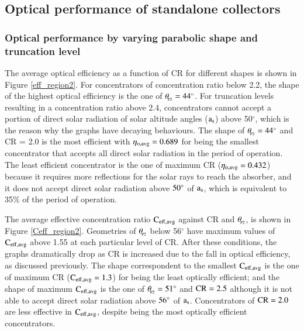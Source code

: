 

\subsection{Optical performance of standalone collectors}

\subsubsection{Optical performance by varying parabolic shape and truncation level}

The average optical efficiency as a function of CR for different shapes is shown in Figure \ref{eff_region2}. For concentrators of concentration ratio below 2.2, the shape of the highest optical efficiency is the one of $\theta_{\!_{\rm{P2}}} = 44^{\circ}$. For truncation levels resulting in a concentration ratio above 2.4, concentrators cannot accept a portion of direct solar radiation of solar altitude angles ($\rm{a_s}$) above 50$^{\circ}$, which is the reason why the graphs have decaying behaviours. The shape of $\theta_{\!_{\rm{P2}}} = 44^{\circ}$ and CR = 2.0 is the most efficient with $\rm{\eta_{o,avg} = 0.689}$ for being the smallest concentrator that accepts all direct solar radiation in the period of operation. The least efficient concentrator is the one of maximum CR ($\rm{\eta_{o,avg} = 0.432}$) because it requires more reflections for the solar rays to reach the absorber, and it does not accept direct solar radiation above $\rm{50^{\circ}}$ of $\rm{a_s}$, which is equivalent to 35\% of the period of operation.


The average effective concentration ratio $\rm{C_{eff,avg}}$ against CR and $\theta_{\!_{\rm{P2}}}$, is shown in Figure \ref{Ceff_region2}. Geometries of $\theta_{\!_{\rm{P2}}}$ below 56$^{\circ}$ have maximum values of $\rm{C_{eff,avg}}$ above 1.55 at each particular level of CR. After these conditions, the graphs dramatically drop as CR is increased due to the fall in optical efficiency, as discussed previously. The shape correspondent to the smallest $\rm{C_{eff,avg}}$ is the one of maximum CR ($\rm{C_{eff,avg} = 1.3}$) for being the least optically efficient; and the shape of maximum $\rm{C_{eff,avg}}$ is the one of $\theta_{\!_{\rm{P2}}} = 51^{\circ}$ and $\rm{CR = 2.5}$ although it is not able to accept direct solar radiation above $\rm{56^{\circ}}$ of $\rm{a_s}$. Concentrators of $\rm{CR = 2.0}$ are less effective in $\rm{C_{eff,avg}}$, despite being the most optically efficient concentrators.


